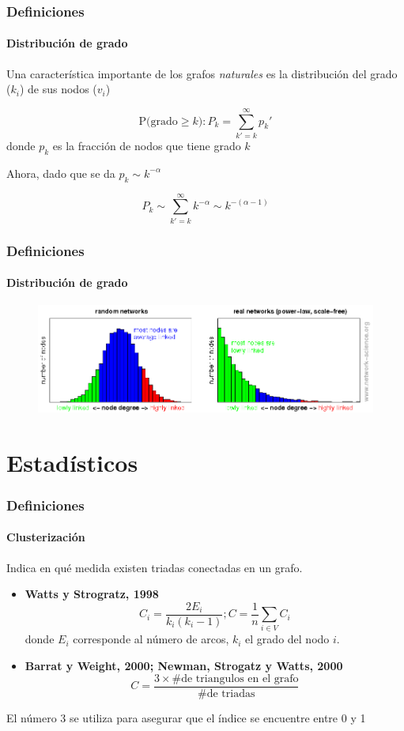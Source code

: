 \documentclass[10pt]{beamer}
\begin{document}
\begin{frame}
\frametitle{Definiciones}
\framesubtitle{Distribuci\'on de grado}
Una caracter\'istica importante de los grafos \emph{naturales} es la distribuci\'on
del grado ($k_i$) de sus nodos ($v_i$)

\begin{equation*}
\text{P(grado$\geq k$)} : P_k = \sum_{k' = k}^{\infty}{p_k'}
\end{equation*}
\noindent donde $p_k$ es la fracci\'on de nodos que tiene grado $k$

\noindent Ahora, dado que se da $p_k \sim k^{-\alpha}$

\begin{equation*}
P_k \sim \sum_{k'=k}^{\infty}{k^{-\alpha}} \sim k^{-(\alpha - 1)}
\end{equation*}

\end{frame}

\begin{frame}
\frametitle{Definiciones}
\framesubtitle{Distribuci\'on de grado}
\begin{figure}
\centering
\includegraphics[width=\linewidth]{../media/node_degree_distribution.png}
\end{figure}
\end{frame}

\section{Estad\'isticos}

\begin{frame}
\frametitle{Definiciones}
\framesubtitle{Clusterizaci\'on}

Indica en qu\'e medida existen triadas conectadas en un grafo.

\begin{itemize}
\item {\bf Watts y Strogratz, 1998}
\begin{equation}
C_i = \frac{2E_i}{k_i(k_i - 1)} ; C = \frac{1}{n}\sum_{i \in V}{C_i}
\end{equation}
\noindent donde $E_i$ corresponde al n\'umero de arcos, $k_i$ el grado del nodo
$i$.
\item {\bf Barrat y Weight, 2000; Newman, Strogatz y Watts, 2000}
\begin{equation}
C = \frac{3 \times \text{\# de triangulos en el grafo}}{\text{\# de triadas}}
\end{equation}
\end{itemize}

El n\'umero 3 se utiliza para asegurar que el \'indice se encuentre entre 0 y 1

\end{frame}
\end{document}
